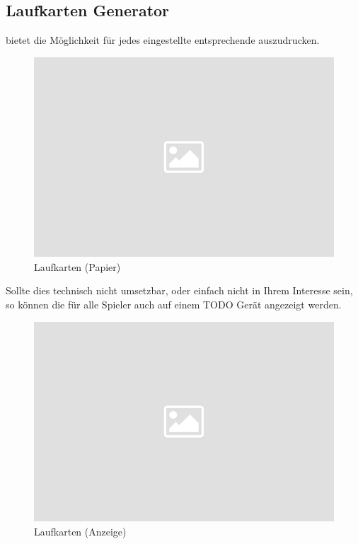 \subsection{Laufkarten Generator}

\noindent
\bb bietet die Möglichkeit für jedes eingestellte \bms entsprechende \lks auszudrucken.\\[.1cm]

\noindent
\begin{figure}[ht]
	\centering
  \includegraphics[width=16cm]{pictures/placeholder.png}
	\caption{Laufkarten (Papier)}
	\label{pic/lk_1}
\end{figure}


\noindent
Sollte dies technisch nicht umsetzbar, oder einfach nicht in Ihrem Interesse sein, so können
die \lks für alle Spieler auch auf einem TODO Gerät angezeigt werden.

\noindent
\begin{figure}[ht]
	\centering
  \includegraphics[width=16cm]{pictures/placeholder.png}
	\caption{Laufkarten (Anzeige)}
	\label{pic/lk_0}
\end{figure}
